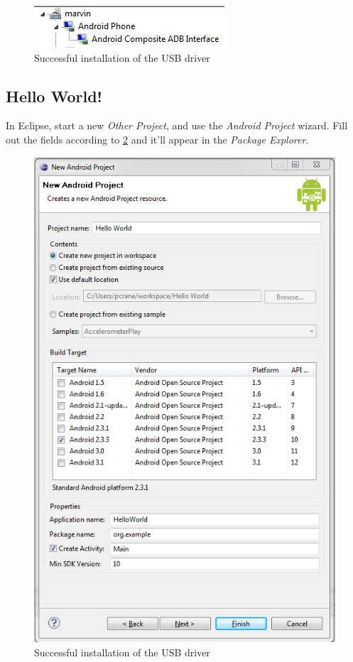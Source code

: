 \begin{figure}[!ht]
  \includegraphics[width=\textwidth]{./images/driver_success.png}%
  \caption{Successful installation of the USB driver}
  \label{fig:success_driver}
\end{figure}

\clearpage

\subsection{Hello World!}

In Eclipse, start a new \textit{Other Project}, and use the \textit{Android Project} wizard. Fill out the fields according to \ref{fig:new_project} and it'll appear in the \textit{Package Explorer}. 

\begin{figure}[!ht]
  \includegraphics[width=\textwidth]{./images/new_project.png}%
  \caption{Successful installation of the USB driver}
  \label{fig:new_project}
\end{figure}


